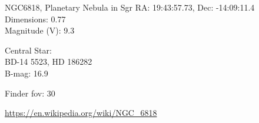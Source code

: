 \begin{block}{NGC6818, Planetary Nebula in Sgr}
    RA: 19:43:57.73, Dec: -14:09:11.4 \\ 
    Dimensions: 0.77 \\ 
    Magnitude (V): 9.3


    Central Star: \\ 
      \hspace{1em}BD-14 5523, HD 186282 \\ 
      \hspace{1em}B-mag: 16.9 


    Finder fov: 30 

    \url{https://en.wikipedia.org/wiki/NGC_6818} 
\end{block}